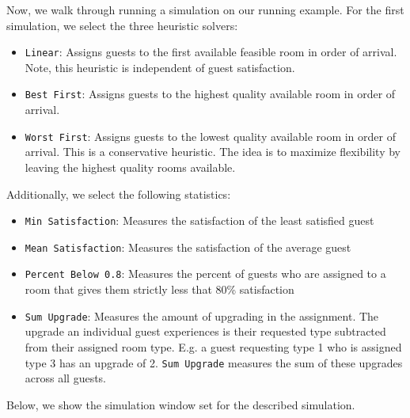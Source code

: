 \documentclass[11 pt]{article}
\begin{document}
\par Now, we walk through running a simulation on our running example. For the first simulation, we select the three heuristic solvers:
\begin{itemize}
    \item \texttt{Linear}: Assigns guests to the first available feasible room in order of arrival. Note, this heuristic is independent of guest satisfaction.
    \item \texttt{Best First}: Assigns guests to the highest quality available room in order of arrival.
     \item \texttt{Worst First}: Assigns guests to the lowest quality available room in order of arrival. This is a conservative heuristic. The idea is to maximize flexibility by leaving the highest quality rooms available. 
\end{itemize}
Additionally, we select the following statistics:
\begin{itemize}
    \item \texttt{Min Satisfaction}: Measures the satisfaction of the least satisfied guest
    \item \texttt{Mean Satisfaction}: Measures the satisfaction of the average guest
    \item \texttt{Percent Below 0.8}: Measures the percent of guests who are assigned to a room that gives them strictly less that 80\% satisfaction
    \item \texttt{Sum Upgrade}: Measures the amount of upgrading in the assignment. The upgrade an individual guest experiences is their requested type subtracted from their assigned room type. E.g. a guest requesting type 1 who is assigned type 3 has an upgrade of 2. \texttt{Sum Upgrade} measures the sum of these upgrades across all guests.
\end{itemize}
Below, we show the simulation window set for the described simulation.
\end{document}
